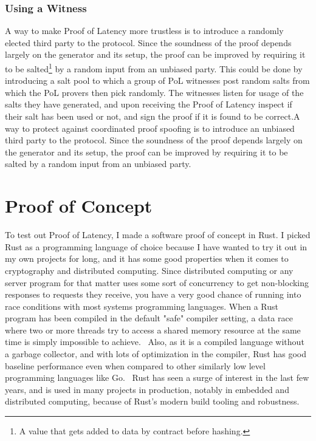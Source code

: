 \subsection{Using a Witness}
A way to make Proof of Latency more trustless is to introduce a randomly elected third party to the protocol. Since the soundness of the proof depends largely on the generator and its setup, the proof can be improved by requiring it to be salted\footnote{A value that gets added to data by contract before hashing.} by a random input from an unbiased party. This could be done by introducing a salt pool to which a group of PoL witnesses post random salts from which the PoL provers then pick randomly. The witnesses listen for usage of the salts they have generated, and upon receiving the Proof of Latency inspect if their salt has been used or not, and sign the proof if it is found to be correct.A way to protect against coordinated proof spoofing is to introduce an unbiased third party to the protocol. Since the soundness of the proof depends largely on the generator and its setup, the proof can be improved by requiring it to be salted by a random input from an unbiased party.


\chapter{Proof of Concept}
\label{Proof of Concept}
To test out Proof of Latency, I made a software proof of concept in Rust. I picked Rust as a programming language of choice because I have wanted to try it out in my own projects for long, and it has some good properties when it comes to cryptography and distributed computing. Since distributed computing or any server program for that matter uses some sort of concurrency to get non-blocking responses to requests they receive, you have a very good chance of running into race conditions with most systems programming languages. When a Rust program has been compiled in the default "safe" compiler setting, a data race where two or more threads try to access a shared memory resource at the same time is simply impossible to achieve.~\cite{The_Rust_Project_Developers2018-xh} Also, as it is a compiled language without a garbage collector, and with lots of optimization in the compiler, Rust has good baseline performance even when compared to other similarly low level programming languages like Go.~\cite{Howarth2020-zc} Rust has seen a surge of interest in the last few years, and is used in many projects in production, notably in embedded and distributed computing, because of Rust's modern build tooling and robustness.

